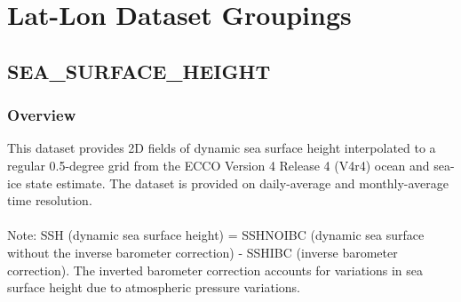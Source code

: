 \section{Lat-Lon Dataset Groupings}
\subsection{SEA\_SURFACE\_HEIGHT}
\subsubsection{Overview}
\newp
This dataset provides 2D fields of dynamic sea surface height interpolated to a regular 0.5-degree grid from the ECCO Version 4 Release 4 (V4r4) ocean and sea-ice state estimate. The dataset is provided on daily-average and monthly-average time resolution.
\\\\
Note: SSH (dynamic sea surface height) = SSHNOIBC (dynamic sea surface without the inverse barometer correction) - SSHIBC (inverse barometer correction). The inverted barometer correction accounts for variations in sea surface height due to atmospheric pressure variations.
\\
